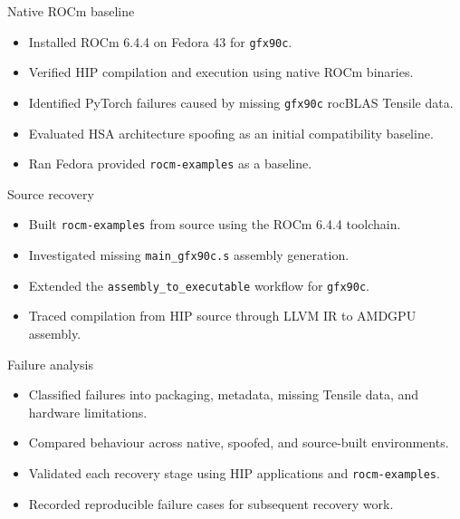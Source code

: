 \documentclass[aspectratio=43,9pt]{beamer}
\begin{document}
\begin{frame}{Native ROCm baseline}
\vspace{-0.5cm}
\begin{itemize}
    \item Installed ROCm 6.4.4 on Fedora 43 for \texttt{gfx90c}.
    \item Verified HIP compilation and execution using native ROCm binaries.
    \item Identified PyTorch failures caused by missing \texttt{gfx90c} rocBLAS Tensile data.
    \item Evaluated HSA architecture spoofing as an initial compatibility baseline.
    \item Ran Fedora provided \texttt{rocm-examples} as a baseline.
\end{itemize}
\end{frame}


\begin{frame}{Source recovery}
\vspace{-0.5cm}
\begin{itemize}
    \item Built \texttt{rocm-examples} from source using the ROCm 6.4.4 toolchain.
    \item Investigated missing \texttt{main\_gfx90c.s} assembly generation.
    \item Extended the \texttt{assembly\_to\_executable} workflow for \texttt{gfx90c}.
    \item Traced compilation from HIP source through LLVM IR to AMDGPU assembly.
\end{itemize}
\end{frame}


\begin{frame}{Failure analysis}
\vspace{-0.5cm}
\begin{itemize}
    \item Classified failures into packaging, metadata, missing Tensile data, and hardware limitations.
    \item Compared behaviour across native, spoofed, and source-built environments.
    \item Validated each recovery stage using HIP applications and \texttt{rocm-examples}.
    \item Recorded reproducible failure cases for subsequent recovery work.
\end{itemize}
\end{frame}
\end{document}
